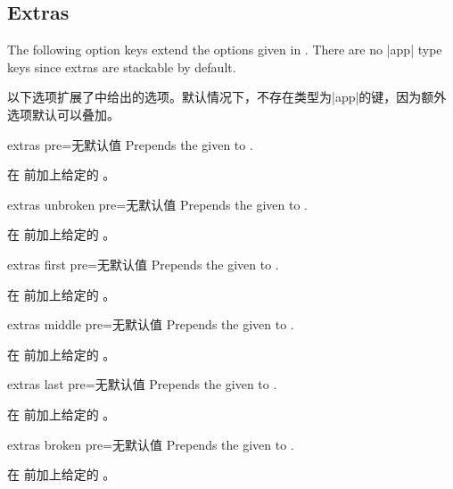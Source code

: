 \subsection{Extras}
The following option keys extend the options given in .
There are no |app| type keys since extras are stackable by default.

以下选项扩展了中给出的选项。默认情况下，不存在类型为|app|的键，因为额外选项默认可以叠加。
\begin{docTcbKey}[][doc new=2015-07-16]{extras pre}{=}{无默认值}
Prepends the given  to .

在  前加上给定的 。
\end{docTcbKey}

\begin{docTcbKey}[][doc new=2015-07-16]{extras unbroken pre}{=}{无默认值}
Prepends the given  to .

在  前加上给定的 。
\end{docTcbKey}

\begin{docTcbKey}[][doc new=2015-07-16]{extras first pre}{=}{无默认值}
Prepends the given  to .

在  前加上给定的 。
\end{docTcbKey}

\begin{docTcbKey}[][doc new=2015-07-16]{extras middle pre}{=}{无默认值}
Prepends the given  to .

在  前加上给定的 。
\end{docTcbKey}

\begin{docTcbKey}[][doc new=2015-07-16]{extras last pre}{=}{无默认值}
Prepends the given  to .

在  前加上给定的 。
\end{docTcbKey}

\begin{docTcbKey}[][doc new=2015-07-16]{extras broken pre}{=}{无默认值}
Prepends the given  to .

在  前加上给定的 。
\end{docTcbKey}

